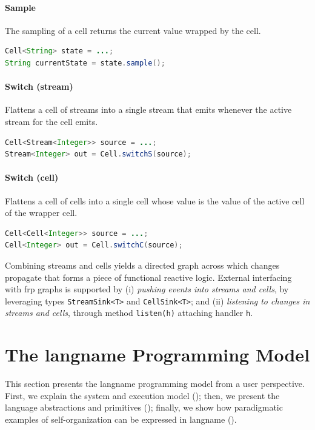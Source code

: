 \paragraph{Sample}
The sampling of a cell returns the current value wrapped by the cell.
%
\begin{lstlisting}[frame=single, language=java]
Cell<String> state = ...;
String currentState = state.sample();
\end{lstlisting}
  
\paragraph{Switch (stream)}
Flattens a cell of streams into a single stream that emits whenever the active stream for the cell emits.
%
\begin{lstlisting}[frame=single, language=java]
Cell<Stream<Integer>> source = ...;
Stream<Integer> out = Cell.switchS(source);
\end{lstlisting}
%
\paragraph{Switch (cell)}
Flattens a cell of cells into a single cell whose value is the value of the active cell of the wrapper cell.
\begin{lstlisting}[frame=single, language=java]
Cell<Cell<Integer>> source = ...;
Cell<Integer> out = Cell.switchC(source);
\end{lstlisting}

  
Combining streams and cells yields a directed graph across which changes propagate
that forms a piece of functional reactive logic.
%
External interfacing with \ac{frp} graphs
 is supported by
 (i) \emph{pushing events into streams and cells}, by leveraging types \texttt{StreamSink<T>} and \texttt{CellSink<T>};
 and
 (ii) \emph{listening to changes in streams and cells}, through method \texttt{listen(h)} attaching handler \texttt{h}.
 
\section{The \ac{langname} Programming Model}
\label{acsos2023-frp:sec:contrib}

%

This section presents the \ac{langname} programming model from a user perspective.
%
First, we explain the system and execution model ();
 then, we present the language abstractions and primitives ();
 finally, we show how paradigmatic examples of self-organization can be expressed in \ac{langname} ().

